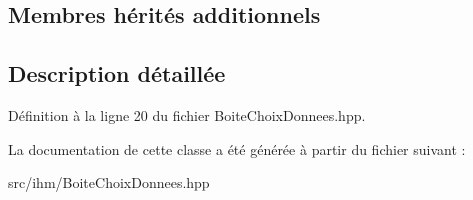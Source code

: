 \subsection*{Membres hérités additionnels}


\subsection{Description détaillée}


Définition à la ligne 20 du fichier Boite\+Choix\+Donnees.\+hpp.



La documentation de cette classe a été générée à partir du fichier suivant \+:\begin{DoxyCompactItemize}
\item 
src/ihm/Boite\+Choix\+Donnees.\+hpp\end{DoxyCompactItemize}
